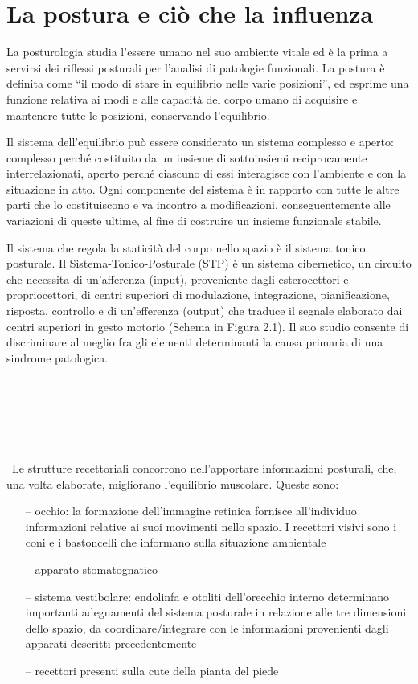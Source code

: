 \chapter{La postura e ciò che la influenza}

La posturologia studia l’essere umano nel suo ambiente vitale ed è la prima a servirsi dei riflessi posturali per l’analisi di patologie funzionali. La postura è definita come “il modo di stare in equilibrio nelle varie posizioni”, ed esprime una funzione relativa ai modi e alle capacità del corpo umano di acquisire e mantenere tutte le posizioni, conservando l’equilibrio. 

Il sistema dell’equilibrio può essere considerato un sistema complesso e aperto: complesso perché costituito da un insieme di sottoinsiemi reciprocamente interrelazionati, aperto perché ciascuno di essi interagisce con l’ambiente e con la situazione in atto. Ogni componente del sistema è in rapporto con tutte le altre parti che lo costituiscono e va incontro a modificazioni, conseguentemente alle variazioni di queste ultime, al fine di costruire un insieme funzionale stabile. 

Il sistema che regola la staticità del corpo nello spazio è il sistema tonico posturale. Il Sistema-Tonico-Posturale (STP) è un sistema cibernetico, un circuito che necessita di un’afferenza (input), proveniente dagli esterocettori e propriocettori, di centri superiori di modulazione, integrazione, pianificazione, risposta, controllo e di un’efferenza (output) che traduce il segnale elaborato dai centri superiori in gesto motorio (Schema in Figura 2.1). Il suo studio consente di discriminare al meglio fra gli elementi determinanti la causa primaria di una sindrome patologica. 
\\\ \\\ \\\ \\\ \\\ \\\ \\\
Le strutture recettoriali concorrono nell’apportare informazioni posturali, che, una volta elaborate, migliorano l’equilibrio muscolare. Queste sono:

 \begin{itemize}
 \itemsep-0.6em 
 \item[--]occhio: la formazione dell’immagine retinica fornisce all’individuo informazioni relative ai suoi movimenti nello spazio. I recettori visivi sono i coni e i bastoncelli che informano sulla situazione ambientale
 \item[--]apparato stomatognatico
 \item[--]sistema vestibolare: endolinfa e otoliti dell’orecchio interno determinano importanti adeguamenti del sistema posturale in relazione alle tre dimensioni dello spazio, da coordinare/integrare con le informazioni provenienti dagli apparati descritti precedentemente
 \item[--]recettori presenti sulla cute della pianta del piede
 \end{itemize}
 

